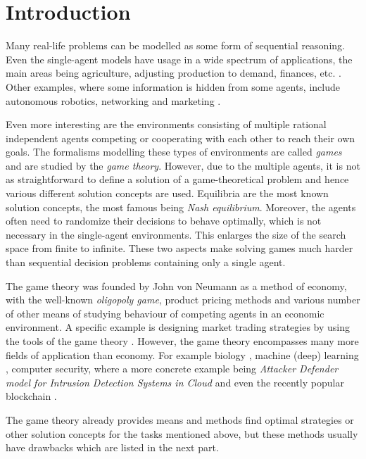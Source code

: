 \documentclass[../main.tex]{subfiles}
\begin{document}
\chapter{Introduction}\label{intro}
Many real-life problems can be modelled as some form of sequential reasoning.
Even the single-agent models have usage in a wide spectrum of applications, the main areas being agriculture, adjusting production to demand, finances, etc. \cite{mdp_applications}.
Other examples, where some information is hidden from some agents, include autonomous robotics, networking and marketing \cite{pomdp_applications}.

Even more interesting are the environments consisting of multiple rational independent agents competing or cooperating with each other to reach their own goals.
The formalisms modelling these types of environments are called \textit{games} and are studied by the \textit{game theory}.
However, due to the multiple agents, it is not as straightforward to define a solution of a game-theoretical problem and hence various different solution concepts are used.
Equilibria are the most known solution concepts, the most famous being \textit{Nash equilibrium}.
Moreover, the agents often need to randomize their decisions to behave optimally, which is not necessary in the single-agent environments.
This enlarges the size of the search space from finite to infinite.
These two aspects make solving games much harder than sequential decision problems containing only a single agent.

The game theory was founded by John von Neumann as a method of economy, with the well-known \textit{oligopoly game}, product pricing methods and various number of other means of studying behaviour of competing agents in an economic environment.
A specific example is designing market trading strategies by using the tools of the game theory \cite{games_market_trading}.
However, the game theory encompasses many more fields of application than economy.
For example biology \cite{games_bio}, machine (deep) learning \cite{games_deeplearning}, computer security, where a more concrete example being \textit{Attacker Defender model for Intrusion Detection Systems in Cloud} \cite{games_cloud} and even the recently popular blockchain \cite{games_blockchain}.

The game theory already provides means and methods find optimal strategies or other solution concepts for the tasks mentioned above, but these methods usually have drawbacks which are listed in the next part.
\end{document}
